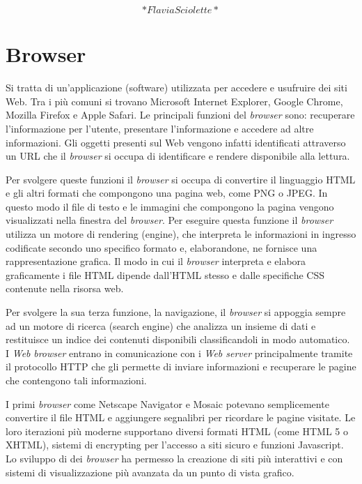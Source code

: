 \documentclass[
  b5paper,
  twoside,
  11pt,
  chapterprefix=false,
  bibliography=totocnumbered,
  listof=flat]{scrbook}
\begin{document}
\[*Flavia Sciolette*\]

\hypertarget{browser}{%
\chapter{Browser}\label{browser}}

Si tratta di un'applicazione (software) utilizzata per accedere e
usufruire dei siti Web. Tra i più comuni si trovano Microsoft Internet
Explorer, Google Chrome, Mozilla Firefox e Apple Safari. Le principali
funzioni del \emph{browser} sono: recuperare l'informazione per l'utente,
presentare l'informazione e accedere ad altre informazioni. Gli oggetti
presenti sul Web vengono infatti identificati attraverso un URL che il
\emph{browser} si occupa di identificare e rendere disponibile alla lettura.

Per svolgere queste funzioni il \emph{browser} si occupa di convertire il
linguaggio HTML e gli altri formati che compongono una pagina web, come
PNG o JPEG. In questo modo il file di testo e le immagini che compongono
la pagina vengono visualizzati nella finestra del \emph{browser}. Per
eseguire questa funzione il \emph{browser} utilizza un motore di rendering
(engine), che interpreta le informazioni in ingresso codificate secondo
uno specifico formato e, elaborandone, ne fornisce una rappresentazione
grafica. Il modo in cui il \emph{browser} interpreta e elabora graficamente i
file HTML dipende dall'HTML stesso e dalle specifiche CSS contenute
nella risorsa web.

Per svolgere la sua terza funzione, la navigazione, il \emph{browser} si
appoggia sempre ad un motore di ricerca (search engine) che analizza un
insieme di dati e restituisce un indice dei contenuti disponibili
classificandoli in modo automatico. I \emph{Web} \emph{browser} entrano in
comunicazione con i \emph{Web server} principalmente tramite il protocollo
HTTP che gli permette di inviare informazioni e recuperare le pagine che
contengono tali informazioni.

I primi \emph{browser} come Netscape Navigator e Mosaic potevano
semplicemente convertire il file HTML e aggiungere segnalibri per
ricordare le pagine visitate. Le loro iterazioni più moderne supportano
diversi formati HTML (come HTML 5 o XHTML), sistemi di encrypting per
l'accesso a siti sicuro e funzioni Javascript. Lo sviluppo di dei
\emph{browser} ha permesso la creazione di siti più interattivi e con sistemi
di visualizzazione più avanzata da un punto di vista grafico.
\end{document}
